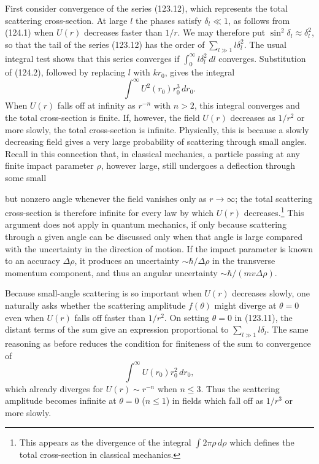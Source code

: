 First consider convergence of the series (123.12), which represents the
total scattering cross-section.  At large $l$ the phases satisfy
$\delta_l\ll1$, as follows from (124.1) when $U(r)$ decreases faster than
$1/r$.  We may therefore put $\sin^2\delta_l\approx\delta_l^2$, so that the
tail of the series (123.12) has the order of
$\sum_{l\gg1}l\delta_l^2$.  The usual integral test shows that this series
converges if $\int_0^\infty l\delta_l^2\,dl$ converges.  Substitution of
(124.2), followed by replacing $l$ with $kr_0$, gives the integral
\[
 \int^{\infty}U^2(r_0)r_0^3\,dr_0.
\]
When $U(r)$ falls off at infinity as $r^{-n}$ with $n>2$, this integral
converges and the total cross-section is finite.  If, however, the field
$U(r)$ decreases as $1/r^2$ or more slowly, the total cross-section is
infinite.  Physically, this is because a slowly decreasing field gives a
very large probability of scattering through small angles.  Recall in this
connection that, in classical mechanics, a particle passing at any finite
impact parameter $\rho$, however large, still undergoes a deflection through
some small

but nonzero angle whenever the field vanishes only as $r\to\infty$; the total
scattering cross-section is therefore infinite for every law by which $U(r)$
decreases.\footnote{This appears as the divergence of the integral
$\int2\pi\rho\,d\rho$ which defines the total cross-section in classical
mechanics.}  This argument does not apply in quantum mechanics, if only
because scattering through a given angle can be discussed only when that
angle is large compared with the uncertainty in the direction of motion.  If
the impact parameter is known to an accuracy $\Delta\rho$, it produces an
uncertainty $\sim\hbar/\Delta\rho$ in the transverse momentum component, and
thus an angular uncertainty $\sim\hbar/(mv\Delta\rho)$.

Because small-angle scattering is so important when $U(r)$ decreases slowly,
one naturally asks whether the scattering amplitude $f(\theta)$ might diverge
at $\theta=0$ even when $U(r)$ falls off faster than $1/r^2$.  On setting
$\theta=0$ in (123.11), the distant terms of the sum give an expression
proportional to $\sum_{l\gg1}l\delta_l$.  The same reasoning as before reduces
the condition for finiteness of the sum to convergence of
\[
 \int^{\infty}U(r_0)r_0^2\,dr_0,
\]
which already diverges for $U(r)\sim r^{-n}$ when $n\leqslant3$.  Thus the
scattering amplitude becomes infinite at $\theta=0$ ($n\leqslant1$) in fields
which fall off as $1/r^3$ or more slowly.

